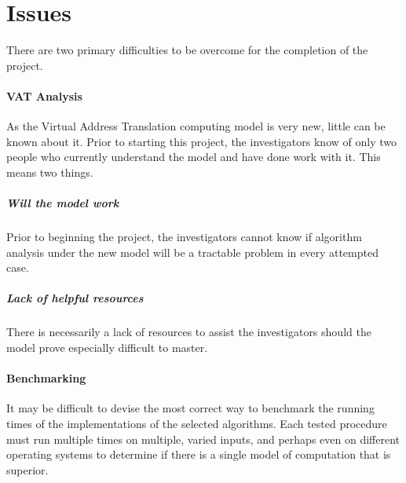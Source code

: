 \section{Issues}
  There are two primary difficulties to be overcome for the completion of the
  project.
  \paragraph{VAT Analysis} As the Virtual Address Translation computing model
  is very new, little can be known about it. Prior to starting this project,
  the investigators know of only two people who currently understand the model
  and have done work with it. This means two things.
    \subparagraph{Will the model work} Prior to beginning the project, the
    investigators cannot know if algorithm analysis under the new model will be
    a tractable problem in every attempted case.
    \subparagraph{Lack of helpful resources} There is necessarily a lack of
    resources to assist the investigators should the model prove especially
    difficult to master.
  \paragraph{Benchmarking} It may be difficult to devise the most correct way
  to benchmark the running times of the implementations of the selected
  algorithms. Each tested procedure must run multiple times on multiple, varied
  inputs, and perhaps even on different operating systems to determine if
  there is a single model of computation that is superior.